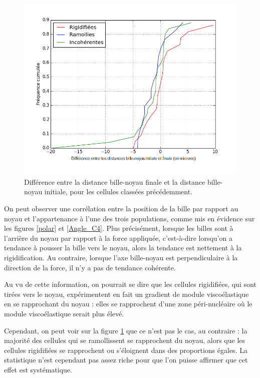 \begin{figure}[p]
\includegraphics[scale=0.45]{Figures/Evolution_DBN.png}
\caption{Différence entre la distance bille-noyau finale et la distance bille-noyau initiale, pour les cellules classées précédemment. \label{DBN}}
\end{figure}



On peut observer une corrélation entre la position de la bille par rapport au noyau et l'appartenance à l'une des trois populations, comme mis en évidence sur les figures \ref{polar} et \ref{Angle_C4}. 
Plus précisément, lorsque les billes sont \og à l'arrière du noyau \fg par rapport à la force appliquée, c'est-à-dire lorsqu'on a tendance à pousser la bille vers le noyau, alors la tendance est nettement à la rigidification. Au contraire, lorsque l'axe bille-noyau est perpendiculaire à la direction de la force, il n'y a pas de tendance cohérente. 

Au vu de cette information, on pourrait se dire que les cellules rigidifiées, qui sont tirées vers le noyau, expérimentent en fait un gradient de module viscoélastique en se rapprochant du noyau : elles se rapprochent d'une zone péri-nucléaire où le module viscoélastique serait plus élevé. 

Cependant, on peut voir sur la figure \ref{DBN} que ce n'est pas le cas, au contraire : la majorité des cellules qui se ramollissent se rapprochent du noyau, alors que les cellules rigidifiées se rapprochent ou s'éloignent dans des proportions égales. La statistique n'est cependant pas assez riche pour que l'on puisse affirmer que cet effet est systématique.

